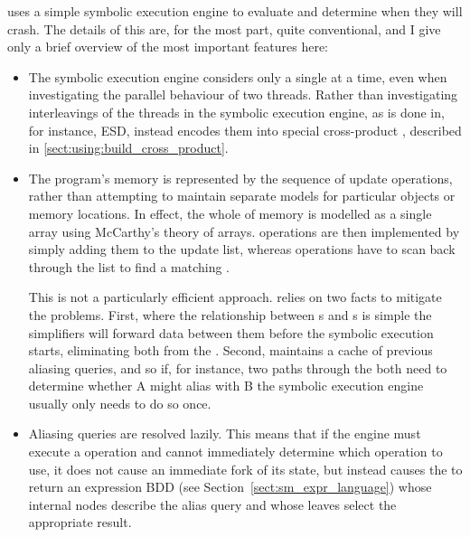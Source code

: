 {\Implementation} uses a simple symbolic execution engine to evaluate
{\StateMachines} and determine when they will crash.  The details of
this are, for the most part, quite conventional, and I give only a
brief overview of the most important features here:

\begin{itemize}
\item The symbolic execution engine considers only a single
  {\StateMachine} at a time, even when investigating the parallel
  behaviour of two threads.  Rather than investigating interleavings
  of the threads in the symbolic execution engine, as is done in, for
  instance, ESD\cite{Zamfir2010}, {\technique} instead encodes them
  into special cross-product {\StateMachines}, described in
  \autoref{sect:using:build_cross_product}.

\item The program's memory is represented by the sequence of update
  operations, rather than attempting to maintain separate models for
  particular objects or memory locations.  In effect, the whole of
  memory is modelled as a single array using McCarthy's theory of
  arrays\needCite{}.   operations are then implemented by
  simply adding them to the update list, whereas 
  operations have to scan back through the list to find a matching
  .

  This is not a particularly efficient approach.  {\Implementation}
  relies on two facts to mitigate the problems.  First, where the
  relationship between s and s is simple the
  {\StateMachine} simplifiers will forward data between them before
  the symbolic execution starts, eliminating both from the
  {\StateMachine}.  Second, {\implementation} maintains a cache of
  previous aliasing queries, and so if, for instance, two paths
  through the {\StateMachine} both need to determine whether
   A might alias with  B the symbolic
  execution engine usually only needs to do so once.

\item Aliasing queries are resolved lazily.  This means that if the
  engine must execute a  operation and cannot immediately
  determine which  operation to use, it does not cause an
  immediate fork of its state, but instead causes the  to
  return an expression BDD (see Section~\ref{sect:sm_expr_language})
  whose internal nodes describe the alias query and whose leaves
  select the appropriate result.  


\end{itemize}
